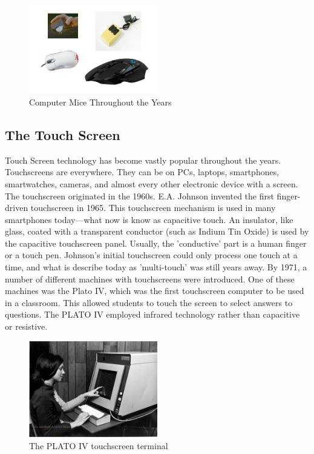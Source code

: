 \documentclass{article}
\begin{document}
\begin{figure}[!ht]
    \caption{Computer Mice Throughout the Years}
    \label{image:mice}
    \centering
    \includegraphics[width=0.5\textwidth]{pics/mice.png}
\end{figure}

\newpage
\subsection{The Touch Screen}
Touch Screen technology has become vastly popular throughout the years. Touchscreens are everywhere. They can be on PCs, laptops, smartphones, smartwatches, cameras, and almost every other electronic device with a screen. The touchscreen originated in the 1960s. E.A. Johnson invented the first finger-driven touchscreen in 1965. This touchscreen mechanism is used in many smartphones today—what now is know as capacitive touch. An insulator, like glass, coated with a transparent conductor (such as Indium Tin Oxide) is used by the capacitive touchscreen panel. Usually, the 'conductive' part is a human finger or a touch pen. Johnson's initial touchscreen could only process one touch at a time, and what is describe today as 'multi-touch' was still years away. By 1971, a number of different machines with touchscreens were introduced. One of these machines was the Plato IV, which was the first touchscreen computer to be used in a classroom. This allowed students to touch the screen to select answers to questions. The PLATO IV employed infrared technology rather than capacitive or resistive. 
\cite{ref8}

\begin{figure}[!ht]
    \caption{The PLATO IV touchscreen terminal}
    \label{image:PLATOIV}
    \centering
    \includegraphics[width=0.5\textwidth]{pics/plato_iv.jpg}
\end{figure}
\end{document}
